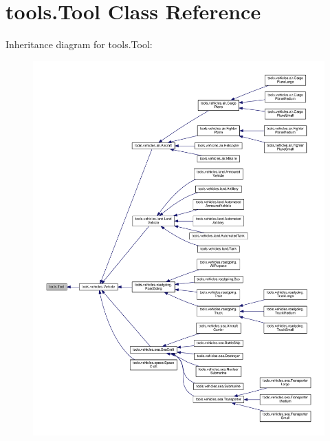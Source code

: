 \hypertarget{classtools_1_1_tool}{}\section{tools.\+Tool Class Reference}
\label{classtools_1_1_tool}


Inheritance diagram for tools.\+Tool\+:\nopagebreak
\begin{figure}[H]
\begin{center}
\leavevmode
\includegraphics[width=350pt]{classtools_1_1_tool__inherit__graph}
\end{center}
\end{figure}
